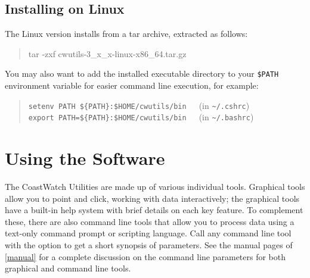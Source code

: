 \subsection{Installing on Linux}

The Linux version installs from a tar archive, extracted as follows:
\begin{quote}
  {\file tar -zxf cwutils-3\_x\_x-linux-x86\_64.tar.gz}
\end{quote}
You may also want to add the installed executable directory to
your {\tt \$PATH} environment variable for easier command line
execution, for example:
\begin{quote}
  {\tt setenv PATH \$\{PATH\}:\$HOME/cwutils/bin}~~~(in {\tt \~{ }/.cshrc}) \\
  {\tt export PATH=\$\{PATH\}:\$HOME/cwutils/bin}~~~(in {\tt \~{ }/.bashrc})
\end{quote}

\section{Using the Software}

The CoastWatch Utilities are made up of various individual tools.
Graphical tools allow you to point and click, working with data
interactively; the graphical tools have a built-in help system
with brief details on each key feature.  To complement these,
there are also command line tools that allow you to process data
using a text-only command prompt or scripting language.  Call any
command line tool with the  option to get a
short synopsis of parameters.  See the manual pages of
\autoref{manual} for a complete discussion on the command line
parameters for both graphical and command line tools.

